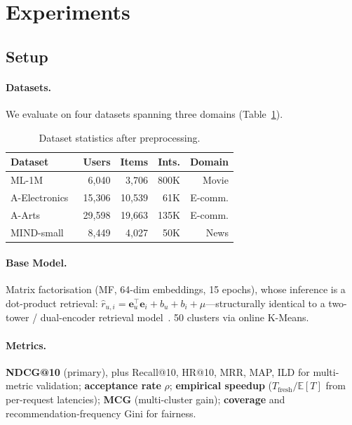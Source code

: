 \documentclass[sigconf,nonacm=false]{acmart}
\begin{document}
\section{Experiments}
\label{sec:experiments}

\subsection{Setup}

\paragraph{Datasets.} We evaluate on four datasets spanning three domains (Table~\ref{tab:datasets}).

\begin{table}[t]
\centering
\caption{Dataset statistics after preprocessing.}
\label{tab:datasets}
\small
\begin{tabular}{lrrrr}
\toprule
\textbf{Dataset} & \textbf{Users} & \textbf{Items} & \textbf{Ints.} & \textbf{Domain} \\
\midrule
ML-1M~\cite{movielens2015} & 6,040 & 3,706 & 800K & Movie \\
A-Electronics~\cite{amazon2023} & 15,306 & 10,539 & 61K & E-comm. \\
A-Arts~\cite{amazon2023} & 29,598 & 19,663 & 135K & E-comm. \\
MIND-small~\cite{mind2020} & 8,449 & 4,027 & 50K & News \\
\bottomrule
\end{tabular}
\end{table}

\paragraph{Base Model.} Matrix factorisation (MF, 64-dim embeddings, 15 epochs), whose inference is a dot-product retrieval: $\hat{r}_{u,i} = \mathbf{e}_u^\top \mathbf{e}_i + b_u + b_i + \mu$---structurally identical to a two-tower / dual-encoder retrieval model~\cite{he2017ncf}. 50 clusters via online K-Means.

\paragraph{Metrics.} \textbf{NDCG@10} (primary), plus Recall@10, HR@10, MRR, MAP, ILD for multi-metric validation; \textbf{acceptance rate} $\rho$; \textbf{empirical speedup} ($T_{\text{fresh}} / \mathbb{E}[T]$ from per-request latencies); \textbf{MCG} (multi-cluster gain); \textbf{coverage} and recommendation-frequency Gini for fairness.
\end{document}

